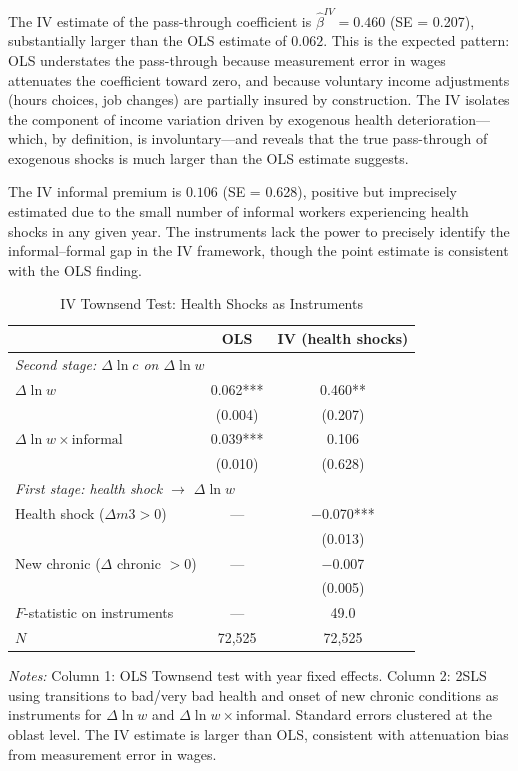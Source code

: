 \documentclass[12pt]{article}
\begin{document}
The IV estimate of the pass-through coefficient is $\hat{\beta}^{IV} = 0.460$ (SE = 0.207), substantially larger than the OLS estimate of $0.062$. This is the expected pattern: OLS understates the pass-through because measurement error in wages attenuates the coefficient toward zero, and because voluntary income adjustments (hours choices, job changes) are partially insured by construction. The IV isolates the component of income variation driven by exogenous health deterioration---which, by definition, is involuntary---and reveals that the true pass-through of exogenous shocks is much larger than the OLS estimate suggests.

The IV informal premium is $0.106$ (SE = 0.628), positive but imprecisely estimated due to the small number of informal workers experiencing health shocks in any given year. The instruments lack the power to precisely identify the informal--formal gap in the IV framework, though the point estimate is consistent with the OLS finding.

\begin{table}[htbp]
\centering
\caption{IV Townsend Test: Health Shocks as Instruments}
\label{tab:iv_townsend}
\small
\begin{tabular}{lcc}
\toprule
 & OLS & IV (health shocks) \\
\midrule
\multicolumn{3}{l}{\textit{Second stage: $\Delta \ln c$ on $\Delta \ln w$}} \\[4pt]
$\Delta \ln w$ & 0.062*** & 0.460** \\
 & (0.004) & (0.207) \\[4pt]
$\Delta \ln w \times \text{informal}$ & 0.039*** & 0.106 \\
 & (0.010) & (0.628) \\[8pt]
\multicolumn{3}{l}{\textit{First stage: health shock $\to$ $\Delta \ln w$}} \\[4pt]
Health shock ($\Delta m3 > 0$) & --- & $-$0.070*** \\
 & & (0.013) \\[4pt]
New chronic ($\Delta$ chronic $> 0$) & --- & $-$0.007 \\
 & & (0.005) \\[4pt]
$F$-statistic on instruments & --- & 49.0 \\
$N$ & 72,525 & 72,525 \\
\bottomrule
\end{tabular}
\begin{minipage}{0.9\textwidth}
\vspace{0.3em}
\footnotesize \textit{Notes:} Column 1: OLS Townsend test with year fixed effects. Column 2: 2SLS using transitions to bad/very bad health and onset of new chronic conditions as instruments for $\Delta \ln w$ and $\Delta \ln w \times \text{informal}$. Standard errors clustered at the oblast level. The IV estimate is larger than OLS, consistent with attenuation bias from measurement error in wages.
\end{minipage}
\end{table}
\end{document}
